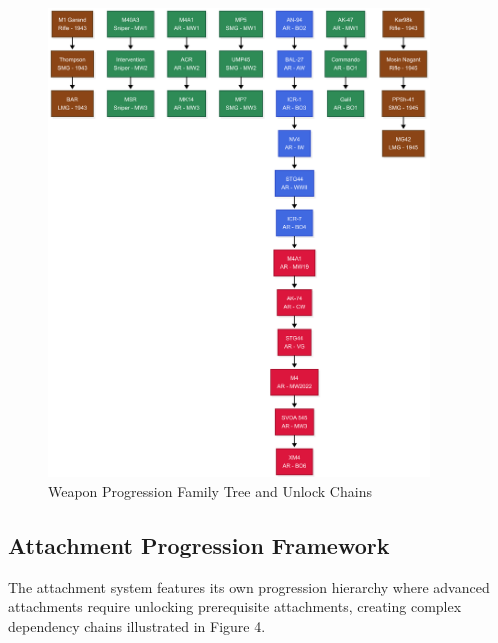 \documentclass[12pt,a4paper]{article}
\begin{document}
\begin{figure}[H]
    \centering
    \includegraphics[width=0.9\textwidth]{../diagrams/weapon-progression-family-tree-vertical.png}
    \caption{Weapon Progression Family Tree and Unlock Chains}
\end{figure}

\subsection{Attachment Progression Framework}

The attachment system features its own progression hierarchy where advanced
attachments require unlocking prerequisite attachments, creating complex
dependency chains illustrated in Figure 4.
\end{document}
